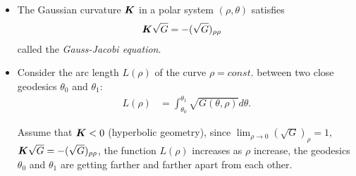 \documentclass[11pt]{article}
\begin{document}
\begin{itemize}
\item \begin{remark} The Gaussian curvature $\boldsymbol{K}$ in a polar system $(\rho, \theta)$ satisfies 
\begin{align}
\mb{K}\sqrt{G} &= -(\sqrt{G})_{\rho\rho} \nonumber %
\end{align}
called the \emph{Gauss-Jacobi equation}. \end{remark}



\item Consider the arc length $L(\rho)$ of the curve $\rho = const.$ between two close geodesics $\theta_{0}$ and $\theta_{1}$: 
\begin{align*}
L(\rho) &= \int_{\theta_{0}}^{\theta_{1}}\sqrt{G(\theta, \rho)}d\theta.
\end{align*}

Assume that $\boldsymbol{K}<0$ (hyperbolic geometry), since $\lim_{\rho\rightarrow 0}(\sqrt{G})_{\rho} = 1$, $\boldsymbol{K}\sqrt{G} = -(\sqrt{G})_{\rho\rho}$, the function $L(\rho)$ increases as $\rho$ increase, the geodesics $\theta_{0}$ and $\theta_{1}$ are getting farther and farther apart from each other. 


\end{itemize}
\end{document}
